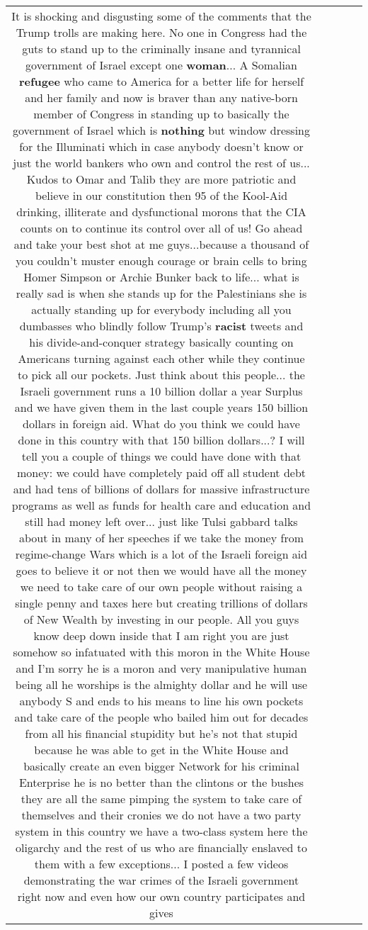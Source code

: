 \documentclass[11pt]{article}
\newlength\mylength
\begin{document}
\begin{center}
\begin{longtable}{|C{.65\mylength}|C{.30\mylength}|C{.12\mylength}|C{.12\mylength}|C{.12\mylength}|}
  \small It is shocking and disgusting some of the comments that the Trump trolls are making here. No one in Congress had the guts to stand up to the criminally insane and tyrannical government of Israel except one \textbf{woman}... A Somalian \textbf{refugee} who came to America for a better life for herself and her family and now is braver than any native-born member of Congress in standing up to basically the government of Israel which is \textbf{nothing} but window dressing for the Illuminati which in case anybody doesn't know or just the world bankers who own and control the rest of us... Kudos to Omar and Talib they are more patriotic and believe in our constitution then 95 of the Kool-Aid drinking, illiterate and dysfunctional morons that the CIA counts on to continue its control over all of us! Go ahead and take your best shot at me guys...because a thousand of you couldn't muster enough courage or brain cells to bring Homer Simpson or Archie Bunker back to life... what is really sad is when she stands up for the Palestinians she is actually standing up for everybody including all you dumbasses who blindly follow Trump's \textbf{racist} tweets and his divide-and-conquer strategy basically counting on Americans turning against each other while they continue to pick all our pockets. Just think about this people... the Israeli government runs a 10 billion dollar a year Surplus and we have given them in the last couple years 150 billion dollars in foreign aid. What do you think we could have done in this country with that 150 billion dollars...? I will tell you a couple of things we could have done with that money: we could have completely paid off all student debt and had tens of billions of dollars for massive infrastructure programs as well as funds for health care and education and still had money left over... just like Tulsi gabbard talks about in many of her speeches if we take the money from regime-change Wars which is a lot of the Israeli foreign aid goes to believe it or not then we would have all the money we need to take care of our own people without raising a single penny and taxes here but creating trillions of dollars of New Wealth by investing in our people. All you guys know deep down inside that I am right you are just somehow so infatuated with this moron in the White House and I'm sorry he is a moron and very manipulative human being all he worships is the almighty dollar and he will use anybody S and ends to his means to line his own pockets and take care of the people who bailed him out for decades from all his financial stupidity but he's not that stupid because he was able to get in the White House and basically create an even bigger Network for his criminal Enterprise he is no better than the clintons or the bushes they are all the same pimping the system to take care of themselves and their cronies we do not have a two party system in this country we have a two-class system here the oligarchy and the rest of us who are financially enslaved to them with a few exceptions... I posted a few videos demonstrating the war crimes of the Israeli government right now and even how our own country participates and gives 
\end{longtable}
\end{center}
\end{document}
